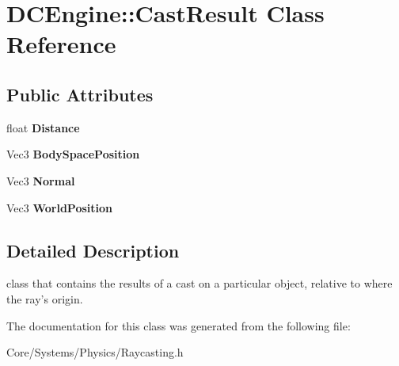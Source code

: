 \hypertarget{structDCEngine_1_1CastResult}{\section{D\-C\-Engine\-:\-:Cast\-Result Class Reference}
\label{structDCEngine_1_1CastResult}
}
\subsection*{Public Attributes}
\begin{DoxyCompactItemize}
\item 
\hypertarget{structDCEngine_1_1CastResult_a7892dbe88a0bd9f389748edaa3683e52}{float {\bfseries Distance}}\label{structDCEngine_1_1CastResult_a7892dbe88a0bd9f389748edaa3683e52}

\item 
\hypertarget{structDCEngine_1_1CastResult_a39130c5d3ce4b5a8ae02061641d884d4}{Vec3 {\bfseries Body\-Space\-Position}}\label{structDCEngine_1_1CastResult_a39130c5d3ce4b5a8ae02061641d884d4}

\item 
\hypertarget{structDCEngine_1_1CastResult_a3e4d66dfe9116904b80d94b7cb1fc609}{Vec3 {\bfseries Normal}}\label{structDCEngine_1_1CastResult_a3e4d66dfe9116904b80d94b7cb1fc609}

\item 
\hypertarget{structDCEngine_1_1CastResult_a4af58c985f6a9ec3af4e0f9430b38aa9}{Vec3 {\bfseries World\-Position}}\label{structDCEngine_1_1CastResult_a4af58c985f6a9ec3af4e0f9430b38aa9}

\end{DoxyCompactItemize}


\subsection{Detailed Description}
class that contains the results of a cast on a particular object, relative to where the ray's origin. 

The documentation for this class was generated from the following file\-:\begin{DoxyCompactItemize}
\item 
Core/\-Systems/\-Physics/Raycasting.\-h\end{DoxyCompactItemize}
